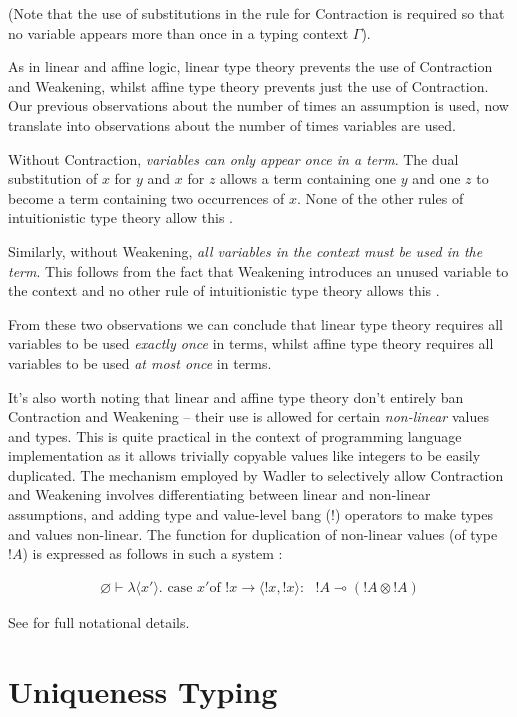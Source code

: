 \documentclass[]{unswthesis}
\newcommand{\case}{\text{ case }}
\newcommand{\of}{\text{of }}
\newcommand{\yields}{\multimap}
\begin{document}
(Note that the use of substitutions in the rule for Contraction is required so that no variable appears more than once in a typing context $\Gamma$).

As in linear and affine logic, linear type theory prevents the use of Contraction and Weakening, whilst affine type theory prevents just the use of Contraction. Our previous observations about the number of times an assumption is used, now translate into observations about the number of times variables are used.

Without Contraction, \textit{variables can only appear once in a term}. The dual substitution of $x$ for $y$ and $x$ for $z$ allows a term containing one $y$ and one $z$ to become a term containing two occurrences of $x$. None of the other rules of intuitionistic type theory allow this \cite{wadler93}.

Similarly, without Weakening, \textit{all variables in the context must be used in the term}. This follows from the fact that Weakening introduces an unused variable to the context and no other rule of intuitionistic type theory allows this \cite{wadler93}.

From these two observations we can conclude that linear type theory requires all variables to be used \textit{exactly once} in terms, whilst affine type theory requires all variables to be used \textit{at most once} in terms.

It's also worth noting that linear and affine type theory don't entirely ban Contraction and Weakening -- their use is allowed for certain \textit{non-linear} values and types. This is quite practical in the context of programming language implementation as it allows trivially copyable values like integers to be easily duplicated. The mechanism employed by Wadler \cite{wadler93} to selectively allow Contraction and Weakening involves differentiating between linear and non-linear assumptions, and adding type and value-level bang (!) operators to make types and values non-linear. The function for duplication of non-linear values (of type $!A$) is expressed as follows in such a system :

\begin{eqnarray*}
\varnothing \vdash \lambda \langle x' \rangle . \case x' \of !x \rightarrow \langle !x, !x\rangle :\text{ } !A \yields (!A \otimes !A)
\end{eqnarray*}

See \cite{wadler93} for full notational details.

\section{Uniqueness Typing}
\end{document}
